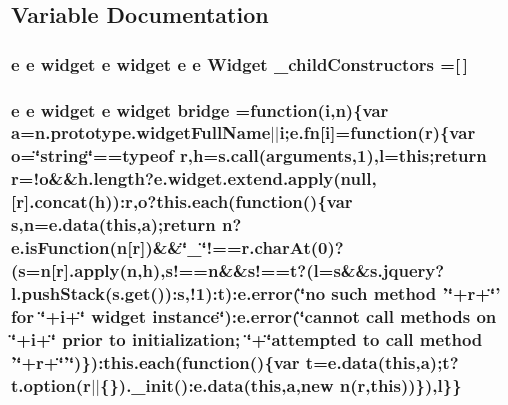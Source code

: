 \subsection{Variable Documentation}
\hypertarget{root_2static_2root_2js_2jquery-ui_8custom_8min_8js_a810998afde10a6b4e3f32418106272a9}{
\subsubsection[{\-\_\-child\-Constructors}]{ {\bf e} {\bf e} {\bf widget} {\bf e} {\bf widget} {\bf e} {\bf e} {\bf Widget} \-\_\-child\-Constructors =\mbox{[}$\,$\mbox{]}}}\label{root_2static_2root_2js_2jquery-ui_8custom_8min_8js_a810998afde10a6b4e3f32418106272a9}
\hypertarget{root_2static_2root_2js_2jquery-ui_8custom_8min_8js_a2ef040fbf477ac97e241201b0993989f}{
\subsubsection[{bridge}]{ {\bf e} {\bf e} {\bf widget} {\bf e} {\bf widget} bridge =function({\bf i},{\bf n})\{var {\bf a}=n.\-prototype.\-widget\-Full\-Name$\vert$$\vert${\bf i};{\bf e.\-fn}\mbox{[}{\bf i}\mbox{]}=function({\bf r})\{var {\bf o}=\char`\"{}string\char`\"{}==typeof {\bf r},{\bf h}={\bf s.\-call}(arguments,1),{\bf l}=this;return {\bf r}=!{\bf o}\&\&h.\-length?e.\-widget.\-extend.\-apply(null,\mbox{[}{\bf r}\mbox{]}.concat({\bf h}))\-:{\bf r},{\bf o}?{\bf this.\-each}(function()\{var {\bf s},{\bf n}={\bf e.\-data}(this,{\bf a});return {\bf n}?e.\-is\-Function({\bf n}\mbox{[}{\bf r}\mbox{]})\&\&\char`\"{}\-\_\-\char`\"{}!==r.\-char\-At(0)?({\bf s}={\bf n}\mbox{[}{\bf r}\mbox{]}.apply({\bf n},{\bf h}),s!=={\bf n}\&\&s!=={\bf t}?({\bf l}={\bf s}\&\&s.\-jquery?l.\-push\-Stack(s.\-get())\-:{\bf s},!1)\-:{\bf t})\-:{\bf e.\-error}(\char`\"{}no such method '\char`\"{}+r+\char`\"{}' for \char`\"{}+i+\char`\"{} widget instance\char`\"{})\-:e.\-error(\char`\"{}cannot {\bf call} methods {\bf on} \char`\"{}+i+\char`\"{} prior to initialization; \char`\"{}+\char`\"{}attempted to {\bf call} method '\char`\"{}+r+\char`\"{}'\char`\"{})\})\-:{\bf this.\-each}(function()\{var {\bf t}={\bf e.\-data}(this,{\bf a});{\bf t}?t.\-option({\bf r}$\vert$$\vert$\{\}).\-\_\-init()\-:{\bf e.\-data}(this,{\bf a},new {\bf n}({\bf r},this))\}),{\bf l}\}\}}}\label{root_2static_2root_2js_2jquery-ui_8custom_8min_8js_a2ef040fbf477ac97e241201b0993989f}
